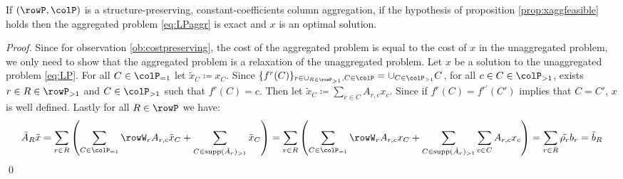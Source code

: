 {\begin{proposition}
If \((\rowP,\colP)\) is a structure-preserving, constant-coefficients column aggregation,
if the hypothesis of proposition \ref{prop:xaggfeasible} holds then the aggregated problem \eqref{eq:LPaggr} is exact and \(x\) is an optimal solution.
\end{proposition}

\begin{proof}
  Since for observation \ref{ob:costpreserving}, the cost of the aggregated problem is equal to the cost of \(x\) in the unaggregated problem, we only need to show that the aggregated problem is a relaxation of the unaggregated problem.
  Let \(x\) be a solution to the unaggregated problem \eqref{eq:LP}. For all \(C \in \colP_{=1}\) let \(\tilde{x}_C \coloneqq x_C\).
  Since  \(\{f^r(C)\}_{r \in \cup_{R\in \rowP_{>1}}, C \in \colP} = \cup_{C \in \colP_{>1}}C\), for all \(c \in C \in \colP_{>1}\), exists \(r \in R \in \rowP_{>1}\) and \(C \in \colP_{>1}\) such that \(f^r(C) = c\).
  Then let \(\tilde{x}_C \coloneqq \sum_{c \in C}A_{r,c}x_c\). Since if \(f^{r}(C)= f^{r'}(C')\) implies that \(C=C'\), \(x\) is well defined.
  Lastly for all \(R \in \rowP\) we have:
  \[\tilde{A}_R\tilde{x} = \sum_{r \in R} \left( \sum_{C \in \colP_{=1}}\rowW_rA_{r,c}\tilde{x}_C + \sum_{C\in \supp(\tilde{A}_r)_{>1}} \tilde{x}_C \right) = \sum_{r \in R} \left( \sum_{C \in \colP_{=1}}\rowW_rA_{r,c}x_C + \sum_{C\in \supp(\tilde{A}_r)_{>1}} \sum_{c \in C}A_{r,c}x_c \right) = \sum_{r \in R} \tilde{\rho_r} b_r = \tilde{b}_R 
  \]
  \qed
\end{proof}
}

